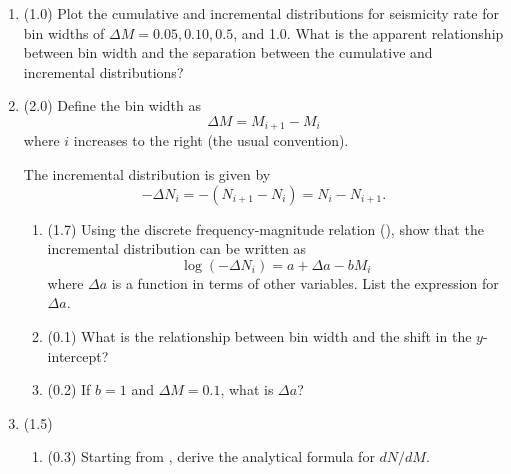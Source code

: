 \documentclass[11pt,titlepage,fleqn]{article}
\begin{document}
\begin{enumerate}

\item (1.0) Plot the cumulative and incremental distributions for seismicity rate for bin widths of $\Delta M = 0.05, 0.10, 0.5$, and 1.0. What is the apparent relationship between bin width and the separation between the cumulative and incremental distributions?


\item (2.0) Define the bin width as
%
\begin{equation}
\Delta M = M_{i+1} - M_i
\label{dM}
\end{equation}
%
where $i$ increases to the right (the usual convention).

The incremental distribution is given by
%
\begin{equation}
-\Delta N_i = -(N_{i+1} - N_i) = N_i - N_{i+1}.
\end{equation}
%
\begin{enumerate}
\item (1.7) Using the discrete frequency-magnitude relation (), show that the incremental distribution can be written as
%
\begin{equation}
\log(-\Delta N_i) = a + \Delta a - b M_i
\label{inc}
\end{equation}
%
where $\Delta a$ is a function in terms of other variables. List the expression for $\Delta a$.


\item (0.1) What is the relationship between bin width and the shift in the $y$-intercept?

\item (0.2) If $b = 1$ and $\Delta M = 0.1$, what is $\Delta a$?
\end{enumerate}


\item  (1.5)
%
\begin{enumerate}
\item (0.3) Starting from , derive the analytical formula for $d N/ d M$.


\end{enumerate}
\end{enumerate}
\end{document}
